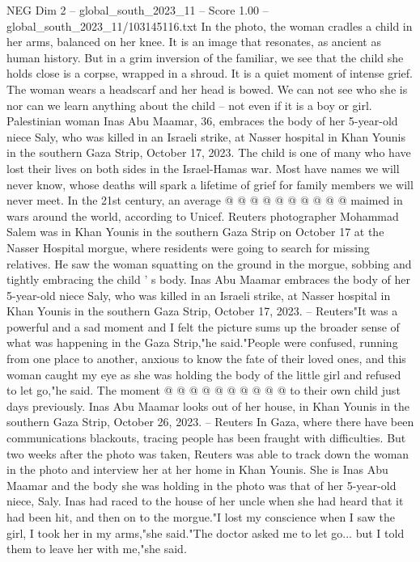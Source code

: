 \begin{textsample}{NEG Dim 2 – global\_south\_2023\_11 – Score 1.00 – global\_south\_2023\_11/103145116.txt}  \label{ex:f2_neg_226}
In the photo, the woman cradles a child in her arms, balanced on her knee.
It is an image that resonates, as ancient as human history.
But in a grim inversion of the familiar, we see that the child she holds close is a corpse, wrapped in a shroud.
It is a quiet moment of intense grief.
The woman wears a headscarf and her head is bowed.
We can not see who she is nor can we learn anything about the child -- not even if it is a boy or girl.
Palestinian woman Inas Abu Maamar, 36, embraces the body of her 5-year-old niece Saly, who was killed in an Israeli strike, at Nasser hospital in Khan Younis in the southern Gaza Strip, October 17, 2023.
The child is one of many who have lost their lives on both sides in the Israel-Hamas war.
Most have names we will never know, whose deaths will spark a lifetime of grief for family members we will never meet.
In the 21st century, an average @ @ @ @ @ @ @ @ @ @ maimed in wars around the world, according to Unicef.
Reuters photographer Mohammad Salem was in Khan Younis in the southern Gaza Strip on October 17 at the Nasser Hospital morgue, where residents were going to search for missing relatives.
He saw the woman squatting on the ground in the morgue, sobbing and tightly embracing the child ' s body.
Inas Abu Maamar embraces the body of her 5-year-old niece Saly, who was killed in an Israeli strike, at Nasser hospital in Khan Younis in the southern Gaza Strip, October 17, 2023. -- Reuters"It was a powerful and a sad moment and I felt the picture sums up the broader sense of what was happening in the Gaza Strip,"he said."People were confused, running from one place to another, anxious to know the fate of their loved ones, and this woman caught my eye as she was holding the body of the little girl and refused to let go,"he said.
The moment @ @ @ @ @ @ @ @ @ @ to their own child just days previously.
Inas Abu Maamar looks out of her house, in Khan Younis in the southern Gaza Strip, October 26, 2023. -- Reuters In Gaza, where there have been communications blackouts, tracing people has been fraught with difficulties.
But two weeks after the photo was taken, Reuters was able to track down the woman in the photo and interview her at her home in Khan Younis.
She is Inas Abu Maamar and the body she was holding in the photo was that of her 5-year-old niece, Saly.
Inas had raced to the house of her uncle when she had heard that it had been hit, and then on to the morgue."I lost my conscience when I saw the girl, I took her in my arms,"she said."The doctor asked me to let go... but I told them to leave her with me,"she said.

\end{textsample}
